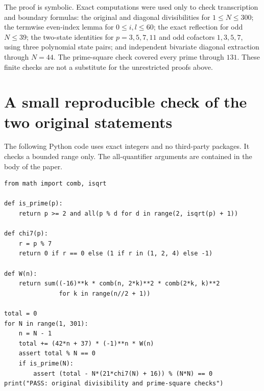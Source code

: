 \documentclass[11pt,a4paper]{article}
\numberwithin{equation}{section}
\theoremstyle{remark}
\begin{document}
The proof is symbolic. Exact computations were used only to
check transcription and boundary formulas: the original and
diagonal divisibilities for \(1\le N\le300\); the termwise
even-index lemma for \(0\le i,l\le60\); the exact reflection for
odd \(N\le39\); the two-state identities for
\(p=3,5,7,11\) and odd cofactors \(1,3,5,7\), using three
polynomial state pairs; and independent bivariate diagonal
extraction through \(N=44\). The prime-square check covered
every prime through \(131\). These finite checks are not a
substitute for the unrestricted proofs above.

\appendix
\section{A small reproducible check of the two original statements}

The following Python code uses exact integers and no third-party
packages. It checks a bounded range only. The all-quantifier
arguments are contained in the body of the paper.
\begin{Verbatim}[fontsize=\small]
from math import comb, isqrt

def is_prime(p):
    return p >= 2 and all(p % d for d in range(2, isqrt(p) + 1))

def chi7(p):
    r = p % 7
    return 0 if r == 0 else (1 if r in (1, 2, 4) else -1)

def W(n):
    return sum((-16)**k * comb(n, 2*k)**2 * comb(2*k, k)**2
               for k in range(n//2 + 1))

total = 0
for N in range(1, 301):
    n = N - 1
    total += (42*n + 37) * (-1)**n * W(n)
    assert total % N == 0
    if is_prime(N):
        assert (total - N*(21*chi7(N) + 16)) % (N*N) == 0
print("PASS: original divisibility and prime-square checks")
\end{Verbatim}
\end{document}
